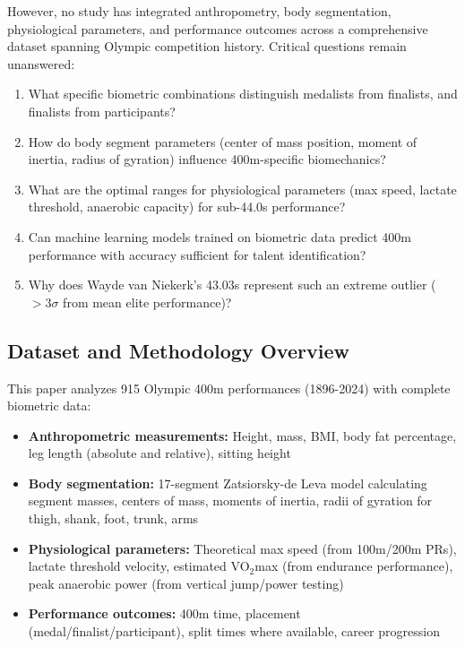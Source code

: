 \documentclass[twocolumn,10pt]{article}
\begin{document}
However, no study has integrated anthropometry, body segmentation, physiological parameters, and performance outcomes across a comprehensive dataset spanning Olympic competition history. Critical questions remain unanswered:

\begin{enumerate}
    \item What specific biometric combinations distinguish medalists from finalists, and finalists from participants?
    \item How do body segment parameters (center of mass position, moment of inertia, radius of gyration) influence 400m-specific biomechanics?
    \item What are the optimal ranges for physiological parameters (max speed, lactate threshold, anaerobic capacity) for sub-44.0s performance?
    \item Can machine learning models trained on biometric data predict 400m performance with accuracy sufficient for talent identification?
    \item Why does Wayde van Niekerk's 43.03s represent such an extreme outlier ($>3\sigma$ from mean elite performance)?
\end{enumerate}

\subsection{Dataset and Methodology Overview}

This paper analyzes 915 Olympic 400m performances (1896-2024) with complete biometric data:
\begin{itemize}
    \item \textbf{Anthropometric measurements:} Height, mass, BMI, body fat percentage, leg length (absolute and relative), sitting height
    \item \textbf{Body segmentation:} 17-segment Zatsiorsky-de Leva model calculating segment masses, centers of mass, moments of inertia, radii of gyration for thigh, shank, foot, trunk, arms
    \item \textbf{Physiological parameters:} Theoretical max speed (from 100m/200m PRs), lactate threshold velocity, estimated VO$_2$max (from endurance performance), peak anaerobic power (from vertical jump/power testing)
    \item \textbf{Performance outcomes:} 400m time, placement (medal/finalist/participant), split times where available, career progression
\end{itemize}
\end{document}
